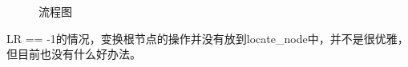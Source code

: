 \documentclass[supercite]{Experimental_Report}
\theoremstyle{definition}
\begin{document}
\begin{figure}[H]
	\centering
	\centering
	\caption{流程图}
	\label{fig6-102}
\end{figure}
LR == -1的情况，变换根节点的操作并没有放到locate\_node中，并不是很优雅，但目前也没有什么好办法。 \\
\end{document}
